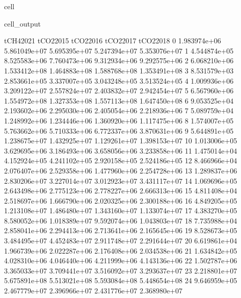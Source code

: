 \documentclass[letterpaper,10pt,english]{jupyterBook}
\begin{document}
\begin{sphinxuseclass}{cell}
\begin{sphinxVerbatimOutput}
\begin{sphinxuseclass}{cell_output}
\begin{sphinxVerbatim}[commandchars=\\\{\}]
       tCH4\PYGZus{}2021     tCO2\PYGZus{}2015     tCO2\PYGZus{}2016     tCO2\PYGZus{}2017     tCO2\PYGZus{}2018  \PYGZbs{}
0   1.983974e+06  5.861049e+07  5.695395e+07  5.247394e+07  5.353076e+07   
1   4.544874e+05  8.525583e+06  7.760473e+06  9.312934e+06  9.292575e+06   
2   6.068210e+06  1.533412e+08  1.464883e+08  1.588768e+08  1.353491e+08   
3   8.531579e+03  2.853661e+05  3.337007e+05  3.043248e+05  3.513524e+05   
4   1.009936e+06  3.209122e+07  2.557824e+07  2.403832e+07  2.942454e+07   
5   6.567960e+06  1.554972e+08  1.327353e+08  1.557113e+08  1.647450e+08   
6   9.053525e+04  2.193602e+06  2.295030e+06  2.405054e+06  2.218936e+06   
7   5.089759e+04  1.248992e+06  1.234446e+06  1.360920e+06  1.117475e+06   
8   1.574007e+05  5.763662e+06  5.710333e+06  6.772337e+06  3.870631e+06   
9   5.644891e+05  1.238675e+07  1.432925e+07  1.129261e+07  1.398153e+07   
10  1.013006e+05  3.629695e+06  3.186493e+06  3.658056e+06  3.233858e+06   
11  1.475014e+04  4.152924e+05  4.241102e+05  2.920158e+05  2.524186e+05   
12  8.466966e+04  2.076407e+06  2.529358e+06  1.477960e+06  2.254728e+06   
13  1.289837e+06  2.830206e+07  3.227014e+07  3.012923e+07  3.431117e+07   
14  1.069696e+05  2.643498e+06  2.775123e+06  2.778227e+06  2.666313e+06   
15  4.811408e+04  2.518697e+06  1.666790e+06  2.020325e+06  2.300188e+06   
16  4.849205e+05  1.213108e+07  1.486480e+07  1.343160e+07  1.133074e+07   
17  4.383270e+05  8.580052e+06  1.018389e+07  9.592074e+06  1.043803e+07   
18  7.735988e+04  2.858041e+06  2.294413e+06  2.713641e+06  2.165645e+06   
19  8.528673e+05  3.484495e+07  4.452483e+07  2.911748e+07  2.291644e+07   
20  6.619861e+04  1.966739e+06  2.022287e+06  2.176408e+06  2.034538e+06   
21  1.634842e+05  4.028310e+06  4.046440e+06  4.211999e+06  4.143136e+06   
22  1.502787e+06  3.365033e+07  3.709441e+07  3.516092e+07  3.293637e+07   
23  2.218801e+07  5.675891e+08  5.513021e+08  5.593084e+08  5.448654e+08   
24  9.646959e+05  2.467779e+07  2.396966e+07  2.431776e+07  2.368980e+07   


\end{sphinxVerbatim}
\end{sphinxuseclass}
\end{sphinxVerbatimOutput}
\end{sphinxuseclass}
\end{document}

